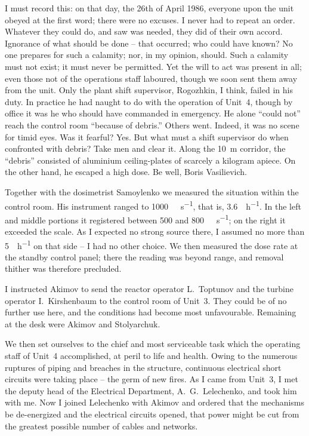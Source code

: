 \documentclass[openright]{bookest}
\begin{document}
I must record this: on that day, the 26th of April 1986, everyone upon the unit obeyed at the first word; there were no excuses. I never had to repeat an order. Whatever they could do, and saw was needed, they did of their own accord. Ignorance of what should be done -- that occurred; who could have known? No one prepares for such a calamity; nor, in my opinion, should. Such a calamity must not exist; it must never be permitted. Yet the will to act was present in all; even those not of the operations staff laboured, though we soon sent them away from the unit. Only the plant shift supervisor, Rogozhkin, I think, failed in his duty. In practice he had naught to do with the operation of Unit~4, though by office it was he who should have commanded in emergency. He alone ``could not'' reach the control room ``because of debris.'' Others went. Indeed, it was no scene for timid eyes. Was it fearful? Yes. But what must a shift supervisor do when confronted with debris? Take men and clear it. Along the \qty{+10}{\metre} corridor, the ``debris'' consisted of aluminium ceiling-plates of scarcely a kilogram apiece. On the other hand, he escaped a high dose. Be well, Boris Vasilievich.

Together with the dosimetrist Samoylenko we measured the situation within the control room. His instrument ranged to \qty{1000}{\micro\roentgen\per\second}, that is, \qty{3.6}{\roentgen\per\hour}. In the left and middle portions it registered between \num{500} and \qty{800}{\micro\roentgen\per\second}; on the right it exceeded the scale. As I expected no strong source there, I assumed no more than \qty{5}{\roentgen\per\hour} on that side -- I had no other choice. We then measured the dose rate at the standby control panel; there the reading was beyond range, and removal thither was therefore precluded.

I instructed Akimov to send the reactor operator L.~Toptunov and the turbine operator I.~Kirshenbaum to the control room of Unit~3. They could be of no further use here, and the conditions had become most unfavourable. Remaining at the desk were Akimov and Stolyarchuk.

We then set ourselves to the chief and most serviceable task which the operating staff of Unit~4 accomplished, at peril to life and health. Owing to the numerous ruptures of piping and breaches in the structure, continuous electrical short circuits were taking place -- the germ of new fires. As I came from Unit~3, I met the deputy head of the Electrical Department, A.~G.~Lelechenko, and took him with me. Now I joined Lelechenko with Akimov and ordered that the mechanisms be de-energized and the electrical circuits opened, that power might be cut from the greatest possible number of cables and networks.
\end{document}
